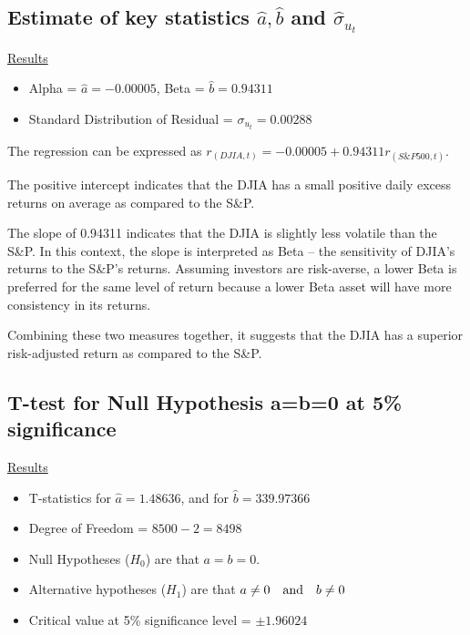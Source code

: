 \documentclass[a4paper]{article}
\begin{document}
	\subsection{Estimate of key statistics $\hat{a},\hat{b}$ and $\hat{\sigma}_{u_t}$}
	\underline{Results}
	\begin{itemize}[nosep]
		\item Alpha = $\hat{a} = -0.00005$, Beta = $\hat{b} = 0.94311$
		\item Standard Distribution of Residual = $\sigma_{u_t} = 0.00288$
	\end{itemize}

	The regression can be expressed as $r_{(DJIA, t)} = -0.00005 +  0.94311 r_{(S\&P500, t)}$.
	
	The positive intercept indicates that the DJIA has a small positive daily excess returns on average as compared to the S\&P. 
	
	The slope of 0.94311 indicates that the DJIA is slightly less volatile than the S\&P. In this context, the slope is interpreted as Beta – the sensitivity of DJIA’s returns to the S\&P’s returns. Assuming investors are risk-averse, a lower Beta is preferred for the same level of return because a lower Beta asset will have more consistency in its returns.
	  
	Combining these two measures together, it suggests that the DJIA has a superior risk-adjusted return as compared to the S\&P. 
	
	
	\subsection{T-test for Null Hypothesis a=b=0 at 5\% significance}
	\underline{Results}
	\begin{itemize}[nosep]
		\item T-statistics for $\hat{a} = 1.48636$, and for $\hat{b} = 339.97366$
		\item Degree of Freedom = $8500 - 2 = 8498$
		\item Null Hypotheses ($H_0$) are that $a=b=0$.
		\item Alternative hypotheses ($H_1$) are that $a\ne 0 \quad \textnormal{and} \quad b\ne 0$
		\item Critical value at 5\% significance level = $\pm1.96024$
	\end{itemize}
	

	
\end{document}
